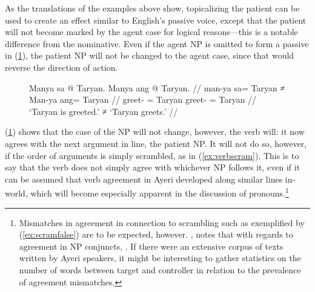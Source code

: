 As the translations of the examples above show, topicalizing the patient can be
used to create an effect similar to English's passive voice, except that the
patient will not become marked by the agent case for logical reasons---this is
a notable difference from the nominative. Even if the agent NP is omitted to
form a passive in (\ref{ex:agtnotnom}), the patient NP will not be changed to
the agent case, since that would reverse the direction of action.

\begin{figure}
\ex\label{ex:agtnotnom}\begingl
	\gla Manya sa @ Taryan. {} Manya ang @ Taryan. //
	\glb man-ya sa= Taryan ≠ Man-ya ang= Taryan //
	\glc greet-\TsgM{} \Parg{}= Taryan {} greet-\TsgM{} \Aarg{}= Taryan //
	\glft `Taryan is greeted.' ≠ `Taryan greets.' //
\endgl\xe
\end{figure}

(\ref{ex:agtnotnom}) shows that the case of the NP will not change, however,
the verb will: it now agrees with the next argument in line, the patient NP. It
will not do so, however, if the order of arguments is simply scrambled, as in
(\ref{ex:verbscram}). This is to say that the verb does not simply agree with
whichever NP follows it, even if it can be assumed that verb agreement in Ayeri
developed along similar lines in-world, which will become especially apparent
in the discussion of pronouns.\footnote{Mismatches in agreement in connection
to scrambling such as exemplified by (\ref{ex:scramfalse}) are to be expected,
however. \citet{corbett2006}, notes that with regards to agreement in NP
conjuncts, . If there were an extensive corpus of texts written by Ayeri
speakers, it might be interesting to gather statistics on the number of words
between target and controller in relation to the prevalence of agreement
mismatches.}

